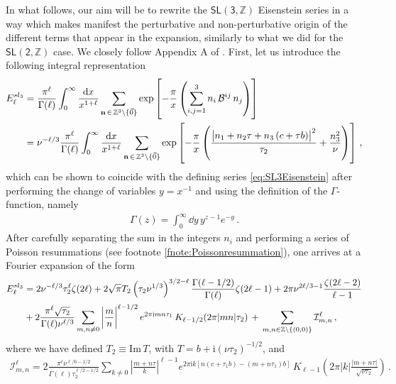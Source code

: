 In what follows, our aim will be to rewrite the $\mathsf{SL(3, \mathbb{Z})}$ Eisenstein series in a way which makes manifest the perturbative and non-perturbative origin of the different terms that appear in the expansion, similarly to what we did for the $\mathsf{SL(2, \mathbb{Z})}$ case. We closely follow Appendix A of \cite{Kiritsis:1997em}. First, let us introduce the following integral representation
%
\begin{align}\label{eq:integralrep}
	\notag E_{\ell}^{sl_3} &= \frac{\pi^\ell}{\Gamma(\ell)} \int_0^{\infty} \frac{{\rm d} x}{x^{1+\ell}} \sum_{\mathbf{n}\, \in\, \mathbb{Z}^3 \setminus \lbrace \vec{0} \rbrace} \exp \left[-\frac{\pi}{x} \left( \sum_{i, j =1}^3 n_i\, \mathcal{B}^{ij}\, n_j\right) \right]\\
 &= \nu^{-\ell/3} \frac{\pi^\ell}{\Gamma(\ell)} \int_0^{\infty} \frac{{\rm d} x}{x^{1+\ell}} \sum_{\mathbf{n}\, \in\, \mathbb{Z}^3 \setminus \lbrace \vec{0} \rbrace} \exp \left[-\frac{\pi}{x} \left( \frac{\left| n_1 + n_2 \tau + n_3 \left( c+ \tau b\right) \right|^2}{\tau_2} + \frac{n_3^2}{\nu}\right) \right]\, ,
\end{align}
%
which can be shown to coincide with the defining series \eqref{eq:SL3Eisenstein} after performing the change of variables $y=x^{-1}$ and using the definition of the $\Gamma$-function, namely 
%
\begin{align}
	\Gamma(z) = \int_0^{\infty} \dd y\, y^{z-1} e^{-y}\, .
\end{align}
%
After carefully separating the sum in the integers $n_i$ and performing a series of Poisson resummations (see footnote \ref{fnote:Poissonresummation}), one arrives at a Fourier expansion of the form \cite{Kiritsis:1997em,Basu:2007ru,Basu:2007ck}
%
\begin{align}\label{eq:instexpSL3}
	\notag E_{\ell}^{sl_3} &= 2\nu^{-\ell/3} \tau_2^\ell \zeta(2\ell) + 2 \sqrt{\pi} T_2 \left( \tau_2 \nu^{1/3}\right)^{3/2-\ell} \frac{\Gamma(\ell-1/2)}{\Gamma(\ell)} \zeta(2\ell-1) + 2\pi \nu^{2\ell/3-1} \frac{\zeta(2\ell-2)}{\ell-1}\\
 &+  2 \frac{\pi^\ell \sqrt{\tau_2}}{\Gamma(\ell) \nu^{\ell/3}} \sum_{m,n \neq 0} \left| \frac{m}{n}\right|^{\ell-1/2} e^{2\pi \text{i} m n\tau_1}\, K_{\ell-1/2} (2\pi |m n| \tau_2)\, +\, \sum_{m, n \in \mathbb{Z} \setminus \lbrace (0,0) \rbrace} \mathcal{I}^\ell_{m, n}\, ,
\end{align}
%
where we have defined $T_2 \equiv \text{Im}\, T$, with $T= b+ \text{i} \left( \nu \tau_2\right)^{-1/2}$, and 
%
\begin{align}
	\mathcal{I}^\ell_{m, n} = 2\frac{\pi^\ell \nu^{\ell/6-1/2}}{\Gamma(\ell) \tau_2^{\ell/2-1/2}} \sum_{k \neq 0} \left| \frac{m+n\tau}{k}\right|^{\ell-1} e^{2\pi \text{i} k \left[n(c+\tau_1 b)- (m+n\tau_1)b \right]}\, K_{\ell-1} \left(2\pi |k|\frac{\left| m+n\tau \right|}{\sqrt{\nu \tau_2}}\right)\, .
\end{align}
